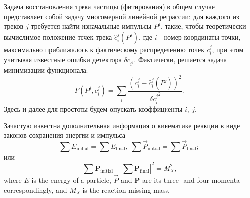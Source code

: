 %
%

Задача восстановления трека частицы (фитирования) в общем случае представляет собой задачу многомерной линейной реграссии: для каждого из треков $j$ требуется найти изначальные импульсы $P^j$, такие, чтобы теоретически вычислимое положение точек трека $\hat{c}_i^j(P^j)$, где $i$ - номер координаты точки, максимально приближалось к фактическому распределению точек $c_i^j$, при этом учитывая известные ошибки детектора $\delta c_{i^j}$. Фактически, решается задача минимизации функционала:
\begin{equation}
\label{track_fit}
F(P^j, c_i^j) = \sum_i \frac{(c_i^j - \hat{c}_i^j(P^j))^2}{{\delta c_i^j}^2}.
\end{equation}
Здесь и далее для простоты будем опускать коэффициенты $i,~j$.

Зачастую известна дополнительная информация о кинематике реакции в виде законов сохранения энергии и импульса
\begin{equation}
\label{cons_full}
\sum E_\mathrm{initial} = \sum E_\mathrm{final},~\sum\vec{P}_\mathrm{initial} = \sum\vec{P}_\mathrm{final};
\end{equation}
или
\begin{equation}
\label{cons_miss}
\displaystyle\left|\sum\boldsymbol{P}_\mathrm{initial} - \sum\boldsymbol{P}_\mathrm{final}\right|^2 = M_X^2,
\end{equation}
where $E$ is the energy of a particle, $\vec{P}$ and $\boldsymbol{P}$ are its three- and four-momenta correspondingly, and $M_X$ is the reaction missing mass.

